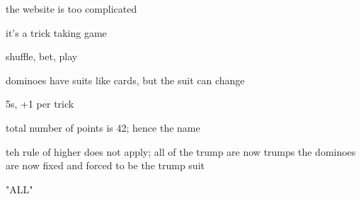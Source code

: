 
the website is too complicated



it's a trick taking game


shuffle, bet, play


dominoes have suits like cards, but the suit can change


5s, +1 per trick

total number of points is 42; hence the name




teh rule of higher does not apply; all of the trump are now trumps
the dominoes are now fixed and forced to be the trump suit


"ALL"
